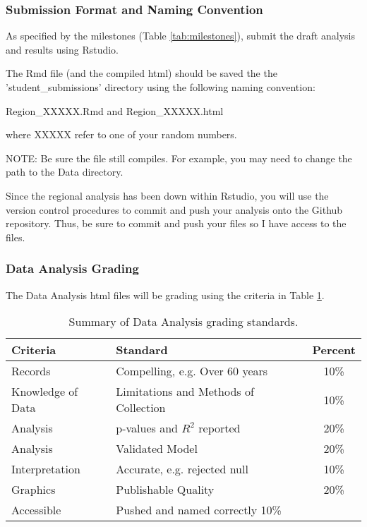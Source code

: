 \subsubsection{Submission Format and Naming Convention}

As specified by the milestones (Table \ref{tab:milestones}), submit the draft analysis and results using Rstudio. 

The Rmd file (and the compiled html) should be saved the the 'student\_submissions' directory using the following naming convention:

\begin{centering}
Region\_XXXXX.Rmd and Region\_XXXXX.html
\end{centering}
\medskip \noindent where XXXXX refer to one of your random numbers.

NOTE: Be sure the file still compiles. For example, you may need to change the path to the Data directory. 

Since the regional analysis has been down within Rstudio, you will use the version control procedures to commit and push your analysis onto the Github repository. Thus, be sure to commit and push your files so I have access to the files. 

\subsubsection{Data Analysis Grading}

The Data Analysis html files will be grading using the criteria in Table \ref{tab:datagrading}.

\begin{table}[h]
\caption{Summary of Data Analysis grading standards.}
\label{tab:datagrading}
\begin{tabular}{llc}\hline
Criteria            &   Standard    & Percent \\ \hline\hline
Records  & Compelling, e.g. Over 60 years & 10\% \\
Knowledge of Data & Limitations and Methods of Collection & 10\% \\
Analysis & p-values and $R^2$ reported  & 20\% \\
Analysis          & Validated Model     & 20\% \\
Interpretation    & Accurate, e.g. rejected null   & 10\% \\
Graphics          & Publishable Quality & 20\% \\
Accessible        & Pushed and named correctly  10\% \\
\hline
\end{tabular}
\end{table}